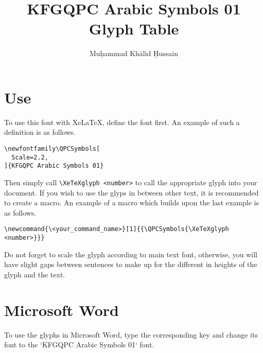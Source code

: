 \documentclass[14pt]{article}
\author{Muḥammad Khālid Ḥussain}
\title{KFGQPC Arabic Symbols 01 Glyph Table}
\date{\Hijritoday[1]}
\begin{document}
\maketitle

\section{\XeLaTeX{} Use}

To use this font with XeLaTeX, define the font first. An example of such a definition is as follows.

\begin{verbatim}
\newfontfamily\QPCSymbols[
  Scale=2.2,
]{KFGQPC Arabic Symbols 01}
\end{verbatim}

Then simply call \verb$\XeTeXglyph <number>$ to call the appropriate glyph into your document. If you wish to use the glyps in between other text, it is recommended to create a macro. An example of a macro which builds upon the last example is as follows.

\begin{verbatim}
\newcommand{\<your_command_name>}[1]{{\QPCSymbols{\XeTeXglyph <number>}}}
\end{verbatim}

Do not forget to scale the glyph according to main text font, otherwise, you will have slight gaps between sentences to make up for the different in heights of the glyph and the text.

\section{Microsoft Word}

To use the glyphs in Microsoft Word, type the corresponding key and change its font to the 
`KFGQPC Arabic Symbols 01` font.
\end{document}
